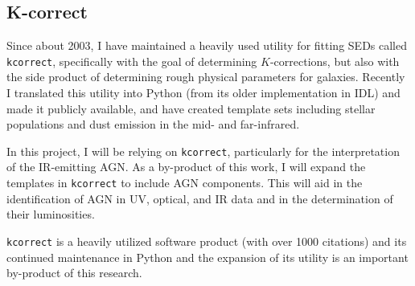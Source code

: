 \documentclass[12pt, preprint]{hacked-aastex}
\begin{document}
\subsection{K-correct}

Since about 2003, I have maintained a heavily used utility for fitting 
SEDs called {\tt kcorrect}, 
specifically with the goal of determining $K$-corrections, but also 
with the side product of determining rough physical parameters for 
galaxies. Recently I translated this utility into Python (from
its older implementation in IDL) and made it publicly available, 
and have created template sets including stellar populations and 
dust emission in the mid- and far-infrared.

In this project, I will be relying on {\tt kcorrect}, particularly 
for the interpretation of the IR-emitting AGN. As a by-product 
of this work, I will expand the templates in {\tt kcorrect} to 
include AGN components. This will aid in the identification of 
AGN in UV, optical, and IR data and in the determination of their
luminosities.

{\tt kcorrect} is a heavily utilized software product (with
over 1000 citations) and its 
continued maintenance in Python and the expansion of its 
utility is an important by-product of this research.
\end{document}

